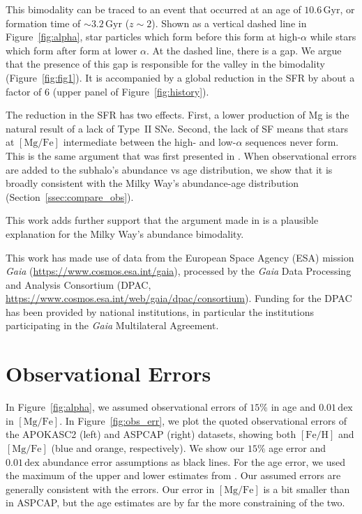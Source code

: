 \documentclass[linenumbers, twocolumn]{aastex631}
\newcommand{\Gyr}{\ensuremath{\textrm{Gyr}}}
\newcommand{\FeH}{\ensuremath{[\textrm{Fe}/\textrm{H}]}}
\newcommand{\MgFe}{\ensuremath{[\textrm{Mg}/\textrm{Fe}]}}
\newcommand{\dex}{\ensuremath{\textrm{dex}}}
\begin{document}
This bimodality can be traced to an event that occurred at an age of $10.6\,\Gyr$, or formation time of $\sim3.2\,\Gyr$ ($z\sim2$). Shown as a vertical dashed line in Figure~\ref{fig:alpha}, star particles which form before this form at high-$\alpha$ while stars which form after form at lower $\alpha$. At the dashed line, there is a gap. We argue that the presence of this gap is responsible for the valley in the bimodality (Figure~\ref{fig:fig1}). It is accompanied by a global reduction in the SFR by about a factor of 6 (upper panel of Figure~\ref{fig:history}).

The reduction in the SFR has two effects. First, a lower production of Mg is the natural result of a lack of Type~II SNe. Second, the lack of SF means that stars at \MgFe{} intermediate between the high- and low-$\alpha$ sequences never form. This is the same argument that was first presented in \citet{2024arXiv240707985B}. When observational errors are added to the subhalo's abundance vs age distribution, we show that it is broadly consistent with the Milky Way's abundance-age distribution (Section~\ref{ssec:compare_obs}).

This work adds further support that the argument made in \citet{2024arXiv240707985B} is a plausible explanation for the Milky Way's abundance bimodality.

\begin{acknowledgements}
This work has made use of data from the European Space Agency (ESA) mission {\it Gaia} (\url{https://www.cosmos.esa.int/gaia}), processed by the {\it Gaia} Data Processing and Analysis Consortium (DPAC, \url{https://www.cosmos.esa.int/web/gaia/dpac/consortium}). Funding for the DPAC has been provided by national institutions, in particular the institutions participating in the {\it Gaia} Multilateral Agreement.
\end{acknowledgements}

{}


\appendix

\section{Observational Errors}\label{app:obs_err}
In Figure~\ref{fig:alpha}, we assumed observational errors of $15\%$ in age and $0.01\,\dex$ in \MgFe{}. In Figure~\ref{fig:obs_err}, we plot the quoted observational errors of the APOKASC2 (left) and ASPCAP (right) datasets, showing both \FeH{} and \MgFe{} (blue and orange, respectively). We show our $15\%$ age error and $0.01\,\dex$ abundance error assumptions as black lines. For the age error, we used the maximum of the upper and lower estimates from \citet{2018ApJS..239...32P}. Our assumed errors are generally consistent with the errors. Our error in \MgFe{} is a bit smaller than in ASPCAP, but the age estimates are by far the more constraining of the two.
\end{document}
